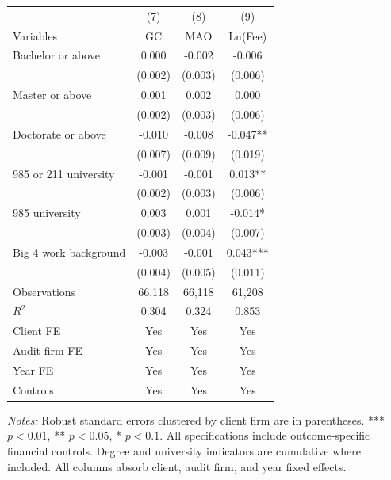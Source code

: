 \documentclass[10pt]{article}
\begin{document}
\begin{minipage}{19cm}\fontsize{10}{12}\selectfont\setlength{\tabcolsep}{4pt}\renewcommand{\arraystretch}{1.12}


\centering
{}
\begin{threeparttable}
\begin{tabular}{p{}ccc}
\toprule
 & (7) & (8) & (9) \\
Variables & GC & MAO & Ln(Fee) \\
\midrule
Bachelor or above & 0.000 & -0.002 & -0.006 \\
 & (0.002) & (0.003) & (0.006) \\
Master or above & 0.001 & 0.002 & 0.000 \\
 & (0.002) & (0.003) & (0.006) \\
Doctorate or above & -0.010 & -0.008 & -0.047** \\
 & (0.007) & (0.009) & (0.019) \\
985 or 211 university & -0.001 & -0.001 & 0.013** \\
 & (0.002) & (0.003) & (0.006) \\
985 university & 0.003 & 0.001 & -0.014* \\
 & (0.003) & (0.004) & (0.007) \\
Big 4 work background & -0.003 & -0.001 & 0.043*** \\
 & (0.004) & (0.005) & (0.011) \\
Observations & 66,118 & 66,118 & 61,208 \\
$R^{2}$ & 0.304 & 0.324 & 0.853 \\
Client FE & Yes & Yes & Yes \\
Audit firm FE & Yes & Yes & Yes \\
Year FE & Yes & Yes & Yes \\
Controls & Yes & Yes & Yes \\
\bottomrule
\end{tabular}
\begin{tablenotes}\fontsize{9}{11}\selectfont
\item \raggedright \fontsize{9}{11}\selectfont \textit{Notes:} Robust standard errors clustered by client firm are in parentheses. *** $p<0.01$, ** $p<0.05$, * $p<0.1$. All specifications include outcome-specific financial controls. Degree and university indicators are cumulative where included.
All columns absorb client, audit firm, and year fixed effects.
\end{tablenotes}
\end{threeparttable}

\end{minipage}
\end{document}
